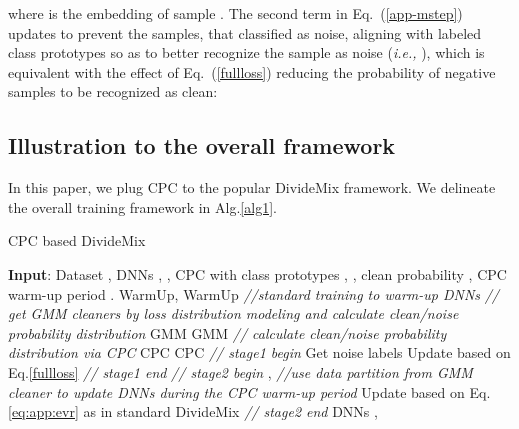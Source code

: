 \documentclass{article} \usepackage{iclr2023_conference,times}
\begin{document}
 where  is the embedding of sample .
 The second term in Eq.~(\ref{app-mstep}) updates  to prevent the samples, that classified as noise, aligning with labeled class prototypes so as to better recognize the sample as noise (\emph{i.e., }), which is equivalent with the effect of Eq.~(\ref{fullloss}) reducing the probability of negative samples to be recognized as clean:
 


\subsection{Illustration to the overall framework} \label{app:alg}
In this paper, we plug CPC to the popular DivideMix framework. We delineate the overall training framework in Alg.\ref{alg1}.

\begin{algorithm}
\renewcommand{\algorithmicrequire}{\textbf{Input:}}
	\renewcommand{\algorithmicensure}{\textbf{Output:}}
	\caption{CPC based DivideMix}
	\label{alg1}
	\begin{algorithmic}[1]
		\STATE \textbf{Input}: Dataset , DNNs , , CPC with class prototypes , , clean probability , CPC warm-up period .
		\STATE   WarmUp, WarmUp      \emph{//standard training to warm-up DNNs}
	\STATE \emph{// get GMM cleaners by loss distribution modeling and calculate clean/noise probability distribution }
		\STATE GMM
		\STATE GMM
	\STATE \emph{// calculate clean/noise probability distribution via CPC}
		\STATE CPC
		\STATE CPC
		\STATE \emph{// stage1 begin}
		\STATE 
		\STATE 
		\STATE Get noise labels 
		\STATE Update  based on Eq.\ref{fullloss}
		\STATE \emph{// stage1 end}
		\STATE \emph{// stage2 begin}
	    \IF{}
        \STATE ,  \emph{//use data partition from GMM cleaner to update DNNs during the CPC warm-up period}
        \ELSE
        \STATE 
		\STATE 
	    \ENDIF
	    \STATE Update  based on Eq.\ref{eq:app:evr} as in standard DivideMix
	    \STATE \emph{// stage2 end}
		\ENDFOR
		\STATE 
		\ENDWHILE
		\ENSURE  DNNs ,  
	\end{algorithmic}  
\end{algorithm}
\end{document}
